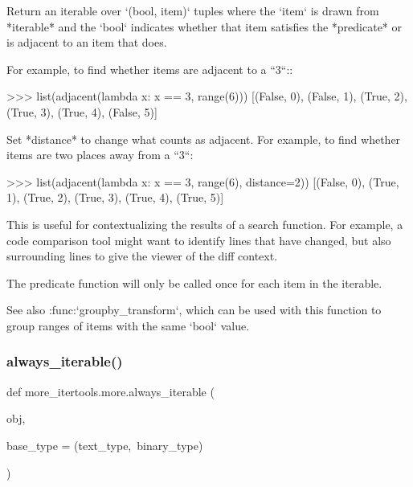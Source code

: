 \begin{DoxyVerb}Return an iterable over `(bool, item)` tuples where the `item` is
drawn from *iterable* and the `bool` indicates whether
that item satisfies the *predicate* or is adjacent to an item that does.

For example, to find whether items are adjacent to a ``3``::

    >>> list(adjacent(lambda x: x == 3, range(6)))
    [(False, 0), (False, 1), (True, 2), (True, 3), (True, 4), (False, 5)]

Set *distance* to change what counts as adjacent. For example, to find
whether items are two places away from a ``3``:

    >>> list(adjacent(lambda x: x == 3, range(6), distance=2))
    [(False, 0), (True, 1), (True, 2), (True, 3), (True, 4), (True, 5)]

This is useful for contextualizing the results of a search function.
For example, a code comparison tool might want to identify lines that
have changed, but also surrounding lines to give the viewer of the diff
context.

The predicate function will only be called once for each item in the
iterable.

See also :func:`groupby_transform`, which can be used with this function
to group ranges of items with the same `bool` value.\end{DoxyVerb}
 \mbox{\label{namespacemore__itertools_1_1more_a18526fd8c54116687234dd106355fa14}} 
\subsubsection{\texorpdfstring{always\+\_\+iterable()}{always\_iterable()}}
{\footnotesize\ttfamily def more\+\_\+itertools.\+more.\+always\+\_\+iterable (\begin{DoxyParamCaption}\item[{}]{obj,  }\item[{}]{base\+\_\+type = {\ttfamily (text\+\_\+type,~binary\+\_\+type)} }\end{DoxyParamCaption})}

